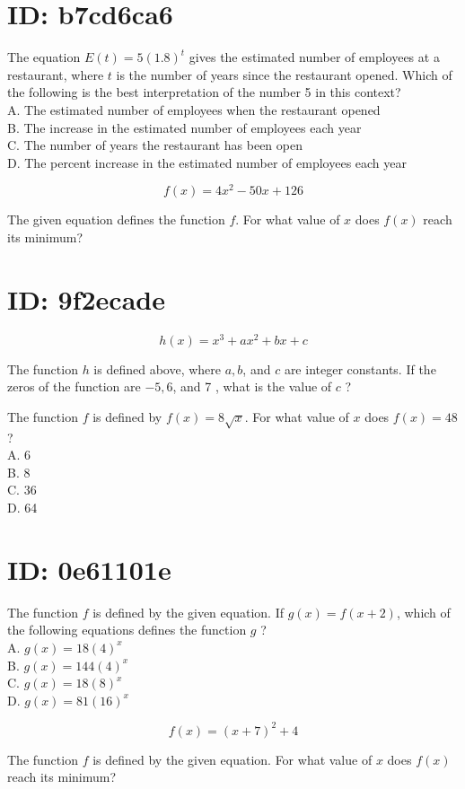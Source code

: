 \section*{ID: b7cd6ca6}
The equation $E(t)=5(1.8)^{t}$ gives the estimated number of employees at a restaurant, where $t$ is the number of years since the restaurant opened. Which of the following is the best interpretation of the number 5 in this context?\\
A. The estimated number of employees when the restaurant opened\\
B. The increase in the estimated number of employees each year\\
C. The number of years the restaurant has been open\\
D. The percent increase in the estimated number of employees each year

$$
f(x)=4 x^{2}-50 x+126
$$

The given equation defines the function $f$. For what value of $x$ does $f(x)$ reach its minimum?

\section*{ID: 9f2ecade}
$$
h(x)=x^{3}+a x^{2}+b x+c
$$

The function $h$ is defined above, where $a, b$, and $c$ are integer constants. If the zeros of the function are $-5,6$, and 7 , what is the value of $c$ ?

The function $f$ is defined by $f(x)=8 \sqrt{x}$. For what value of $x$ does $f(x)=48$ ?\\
A. 6\\
B. 8\\
C. 36\\
D. 64

\section*{ID: 0e61101e}
The function $f$ is defined by the given equation. If $g(x)=f(x+2)$, which of the following equations defines the function $g$ ?\\
A. $g(x)=18(4)^{x}$\\
B. $g(x)=144(4)^{x}$\\
C. $g(x)=18(8)^{x}$\\
D. $g(x)=81(16)^{x}$

$$
f(x)=(x+7)^{2}+4
$$

The function $f$ is defined by the given equation. For what value of $x$ does $f(x)$ reach its minimum?

